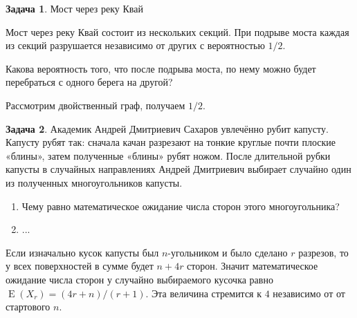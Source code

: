\documentclass[nobib]{tufte-handout}
\theoremstyle{definition}
\newtheorem{problem}{Задача}
\DeclareMathOperator{\E}{E}
\begin{document}
\begin{problem}
Мост через реку Квай

Мост через реку Квай состоит из нескольких секций. При подрыве моста каждая из секций разрушается независимо от других с вероятностью $1/2$.


Какова вероятность того, что после подрыва моста, по нему можно будет перебраться с одного берега на другой?
\begin{sol}
Рассмотрим двойственный граф, получаем $1/2$.
\end{sol}

\end{problem}



\begin{problem}
Академик Андрей Дмитриевич Сахаров увлечённо рубит капусту. Капусту рубят так: сначала качан разрезают на тонкие круглые почти плоские «блины», затем полученные «блины» рубят ножом. После длительной рубки капусты в случайных направлениях Андрей Дмитриевич выбирает случайно один из полученных многоугольников капусты.

\begin{enumerate}
\item Чему равно математическое ожидание числа сторон этого многоугольника?
\item ...
\end{enumerate}



\begin{sol}
Если изначально кусок капусты был $n$-угольником и было сделано $r$ разрезов, то у всех поверхностей в сумме будет $n+4r$ сторон. Значит математическое ожидание числа сторон у случайно выбираемого кусочка равно $\E(X_r)=(4r+n)/(r+1)$. Эта величина стремится к $4$ независимо от от стартового $n$.
\end{sol}

\end{problem}
\end{document}
